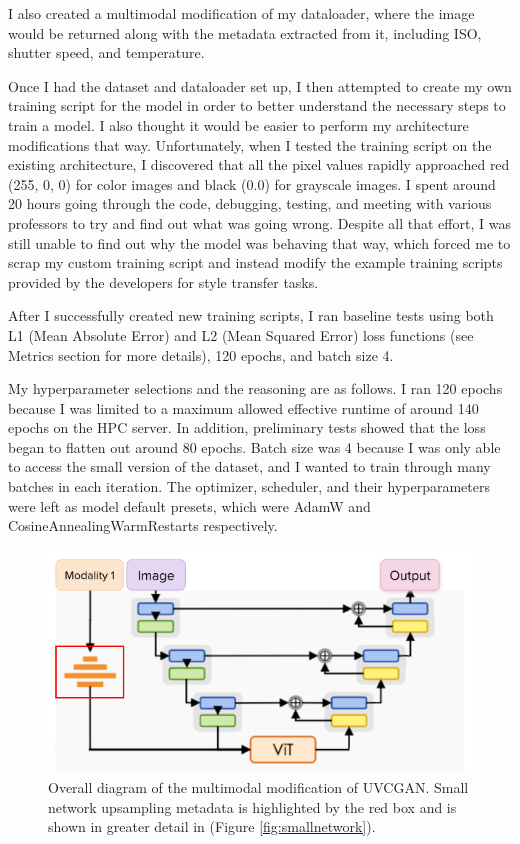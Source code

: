 \documentclass[10pt,twocolumn]{article}
\begin{document}
I also created a multimodal modification of my dataloader, where the image would be returned along with the metadata extracted from it, including ISO, shutter speed, and temperature.

Once I had the dataset and dataloader set up, I then attempted to create my own training script for the model in order to better understand the necessary steps to train a model. I also thought it would be easier to perform my architecture modifications that way. Unfortunately, when I tested the training script on the existing architecture, I discovered that all the pixel values rapidly approached red (255, 0, 0) for color images and black (0.0) for grayscale images. I spent around 20 hours going through the code, debugging, testing, and meeting with various professors to try and find out what was going wrong. Despite all that effort, I was still unable to find out why the model was behaving that way, which forced me to scrap my custom training script and instead modify the example training scripts provided by the developers for style transfer tasks. 

After I successfully created new training scripts, I ran baseline tests using both L1 (Mean Absolute Error) and L2 (Mean Squared Error) loss functions (see Metrics section for more details), 120 epochs, and batch size 4. 

My hyperparameter selections and the reasoning are as follows. I ran 120 epochs because I was limited to a maximum allowed effective runtime of around 140 epochs on the HPC server. In addition, preliminary tests showed that the loss began to flatten out around 80 epochs. Batch size was 4 because I was only able to access the small version of the dataset, and I wanted to train through many batches in each iteration. The optimizer, scheduler, and their hyperparameters were left as model default presets, which were AdamW and CosineAnnealingWarmRestarts respectively.

\begin{figure}[h]
	\centering
        \includegraphics[scale=0.41]{images/mm_arch.png}
	\caption{Overall diagram of the multimodal modification of UVCGAN. Small network upsampling metadata is highlighted by the red box and is shown in greater detail in (Figure \ref{fig:smallnetwork}).}
	\label{fig:mm_arch}
\end{figure}
\end{document}
